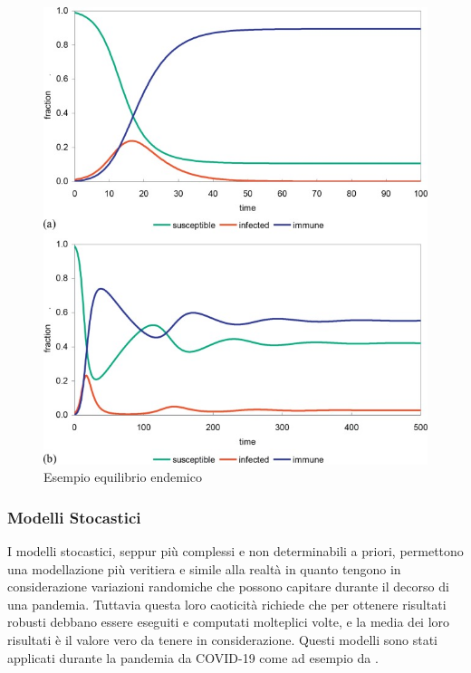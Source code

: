 \begin{figure}[h]
    \begin{center}
        \includegraphics[scale=0.7]{img/3-s2.0-B9780128012383988378-f98837-02-9780128012383.jpg}
        \caption{Esempio equilibrio endemico}
        \label{fig:Endemic_equilibrium}
    \end{center}
\end{figure}

\subsubsection{Modelli Stocastici}
I modelli stocastici, seppur più complessi e non determinabili 
a priori, permettono una modellazione più veritiera e 
simile alla realtà in quanto tengono in considerazione 
variazioni randomiche che possono capitare durante il 
decorso di una pandemia. Tuttavia questa loro caoticità 
richiede che per ottenere risultati robusti debbano essere 
eseguiti e computati molteplici volte, e la media dei loro 
risultati è il valore vero da tenere in considerazione. 
Questi modelli sono stati applicati durante la pandemia da COVID-19 
come ad esempio da \cite{ijerph17103535}. 

